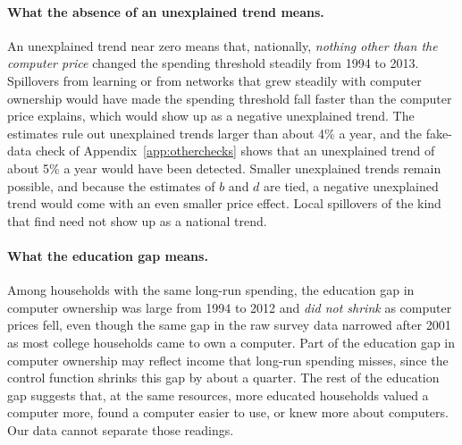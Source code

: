 \documentclass[11pt]{article}
\begin{document}
\paragraph{What the absence of an unexplained trend means.} An unexplained trend near zero means that, nationally, \emph{nothing other than the computer price} changed the spending threshold steadily from 1994 to 2013. Spillovers from learning or from networks that grew steadily with computer ownership would have made the spending threshold fall faster than the computer price explains, which would show up as a negative unexplained trend. The estimates rule out unexplained trends larger than about 4\% a year, and the fake-data check of Appendix~\ref{app:otherchecks} shows that an unexplained trend of about 5\% a year would have been detected. Smaller unexplained trends remain possible, and because the estimates of $b$ and $d$ are tied, a negative unexplained trend would come with an even smaller price effect. Local spillovers of the kind that \citet{goolsbee2002} find need not show up as a national trend.

\paragraph{What the education gap means.} Among households with the same long-run spending, the education gap in computer ownership was large from 1994 to 2012 and \emph{did not shrink} as computer prices fell, even though the same gap in the raw survey data narrowed after 2001 as most college households came to own a computer. Part of the education gap in computer ownership may reflect income that long-run spending misses, since the control function shrinks this gap by about a quarter. The rest of the education gap suggests that, at the same resources, more educated households valued a computer more, found a computer easier to use, or knew more about computers. Our data cannot separate those readings.
\end{document}
